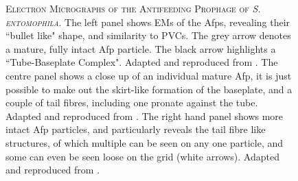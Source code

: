 \vspace{0.1cm}
\begin{figure}[h]
\centering
    \begin{subfigure}[b]{0.41\textwidth}
        \centering
        {%
\setlength{\fboxsep}{0pt}%
\setlength{\fboxrule}{1pt}%
            }%
    \end{subfigure}%
        \begin{subfigure}[t]{0.16\textwidth}
        \centering
        {%
\setlength{\fboxsep}{0pt}%
\setlength{\fboxrule}{1pt}%
        }%
    \end{subfigure}%
    \begin{subfigure}[t]{0.41\textwidth}
        \centering
        {%
\setlength{\fboxsep}{0pt}%
\setlength{\fboxrule}{1pt}%
        }%
        \end{subfigure}%
	\captionsetup{singlelinecheck=off, justification=justified, font=footnotesize, aboveskip=10pt}
	\caption[Electron micrographs of the Antifeeding Prophage]{\textsc{\normalsize Electron Micrographs of the Antifeeding Prophage of \emph{S. entomophila}.}\vspace{0.1cm} \newline The left panel shows EMs of the Afps, revealing their ``bullet like" shape, and similarity to PVCs. The grey arrow denotes a mature, fully intact Afp particle. The black arrow highlights a ``Tube-Baseplate Complex". Adapted and reproduced from \cite{Sen2010}. The centre panel shows a close up of an individual mature Afp, it is just possible to make out the skirt-like formation of the baseplate, and a couple of tail fibres, including one pronate against the tube. Adapted and reproduced from \cite{Hurst2007}. The right hand panel shows more intact Afp particles, and particularly reveals the tail fibre like structures, of which multiple can be seen on any one particle, and some can even be seen loose on the grid (white arrows). Adapted and reproduced from \cite{Heymann2013}.}
	\label{afpEMs}
\end{figure}




